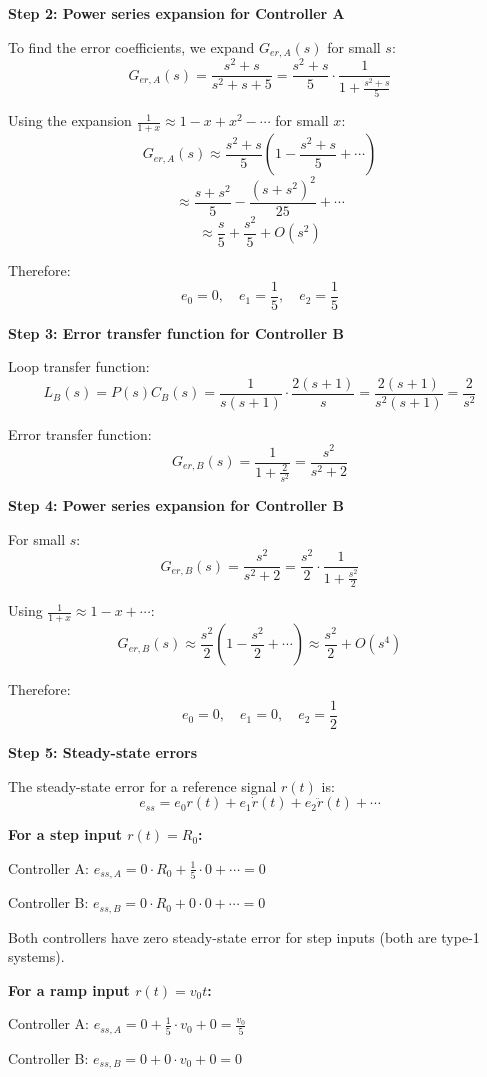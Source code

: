 \documentclass[11pt,a4paper]{article}
\begin{document}
\textbf{Step 2: Power series expansion for Controller A}

To find the error coefficients, we expand $G_{er,A}(s)$ for small $s$:
\[
G_{er,A}(s) = \frac{s^2 + s}{s^2 + s + 5} = \frac{s^2 + s}{5} \cdot \frac{1}{1 + \frac{s^2 + s}{5}}
\]

Using the expansion $\frac{1}{1+x} \approx 1 - x + x^2 - \cdots$ for small $x$:
\[
G_{er,A}(s) \approx \frac{s^2 + s}{5}\left(1 - \frac{s^2 + s}{5} + \cdots\right)
\]
\[
\approx \frac{s + s^2}{5} - \frac{(s + s^2)^2}{25} + \cdots
\]
\[
\approx \frac{s}{5} + \frac{s^2}{5} + O(s^2)
\]

Therefore:
\[
e_0 = 0, \quad e_1 = \frac{1}{5}, \quad e_2 = \frac{1}{5}
\]

\textbf{Step 3: Error transfer function for Controller B}

Loop transfer function:
\[
L_B(s) = P(s)C_B(s) = \frac{1}{s(s+1)} \cdot \frac{2(s+1)}{s} = \frac{2(s+1)}{s^2(s+1)} = \frac{2}{s^2}
\]

Error transfer function:
\[
G_{er,B}(s) = \frac{1}{1 + \frac{2}{s^2}} = \frac{s^2}{s^2 + 2}
\]

\textbf{Step 4: Power series expansion for Controller B}

For small $s$:
\[
G_{er,B}(s) = \frac{s^2}{s^2 + 2} = \frac{s^2}{2} \cdot \frac{1}{1 + \frac{s^2}{2}}
\]

Using $\frac{1}{1+x} \approx 1 - x + \cdots$:
\[
G_{er,B}(s) \approx \frac{s^2}{2}\left(1 - \frac{s^2}{2} + \cdots\right) \approx \frac{s^2}{2} + O(s^4)
\]

Therefore:
\[
e_0 = 0, \quad e_1 = 0, \quad e_2 = \frac{1}{2}
\]

\textbf{Step 5: Steady-state errors}

The steady-state error for a reference signal $r(t)$ is:
\[
e_{ss} = e_0 r(t) + e_1 \dot{r}(t) + e_2 \ddot{r}(t) + \cdots
\]

\textbf{For a step input $r(t) = R_0$:}

Controller A: $e_{ss,A} = 0 \cdot R_0 + \frac{1}{5} \cdot 0 + \cdots = 0$

Controller B: $e_{ss,B} = 0 \cdot R_0 + 0 \cdot 0 + \cdots = 0$

Both controllers have zero steady-state error for step inputs (both are type-1 systems).

\textbf{For a ramp input $r(t) = v_0 t$:}

Controller A: $e_{ss,A} = 0 + \frac{1}{5} \cdot v_0 + 0 = \frac{v_0}{5}$

Controller B: $e_{ss,B} = 0 + 0 \cdot v_0 + 0 = 0$
\end{document}

